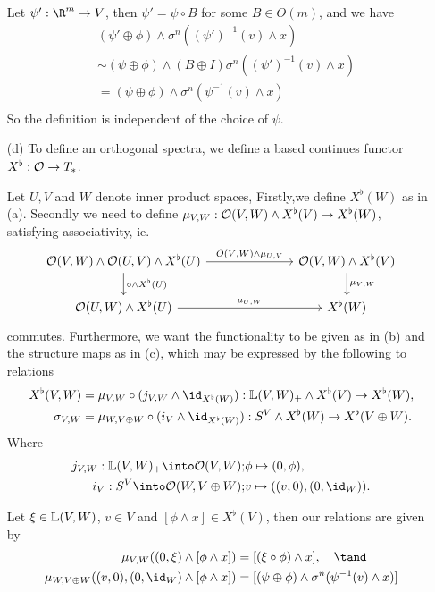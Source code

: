 \begin{exercise}[2]
\begin{enumerate}
Let $\psi' : \R^m \to V$, then $\psi' = \psi \circ B$ for some $B \in O(m)$, and
we have
\begin{align*}
&(\psi' \oplus \phi) \wedge \sigma^n ((\psi')^{-1}(v) \wedge x) \\
&\sim (\psi \oplus \phi) \wedge (B \oplus I)\sigma^n ((\psi')^{-1}(v) \wedge x) \\
&= (\psi \oplus \phi) \wedge \sigma^n (\psi^{-1}(v) \wedge x) \\
\end{align*}
So the definition is independent of the choice of $\psi$.

\item[(d)]
To define an orthogonal spectra, we define a based continues functor $X^\flat :
\mathcal{O} \to T_*$. 


Let $U, V$ and $W$ denote inner product spaces, 
Firstly,we define $X^\flat (W)$ as in (a). Secondly we need to define 
$\mu_{V,W}: \mathcal{O}(V, W) \wedge X^\flat(V) \to X^\flat(W)$, satisfying
associativity, ie. 
\[ \begin{tikzcd}[column sep = 7em]
\O(V, W) \wedge \O(U,V) \wedge X^\flat(U) 
\arrow[r, "O(V{,}W) \wedge \mu_{U{,}V}"] 
\arrow[d, "\circ \wedge X^\flat(U)"] 
& \O(V, W) \wedge X^\flat(V) 
\arrow[d, "\mu_{V{,}W}"] \\ 
\O(U,W) \wedge X^\flat(U) 
\arrow[r, "\mu_{U{,}W}"] 
& X^\flat(W)
\end{tikzcd} \]
commutes. Furthermore, we want the functionality to be given as in (b) and the
structure maps as in (c), which may be expressed by the following to relations
\begin{equation}
\begin{split}
X^\flat(V,W) &= \mu_{V, W} \circ (j_{V,W} \wedge \id_{X^\flat(W)}) : 
\L(V, W)_+ \wedge X^\flat (V) \to X^\flat(W),
\\
\sigma_{V,W} &= \mu_{W,V\oplus W} \circ (i_V \wedge \id_{X^\flat(W)}) :
S^V \wedge X^\flat (W) \to X^\flat(V \oplus W).
\end{split}
\end{equation}
Where 
\begin{align*}
j_{V,W} : \L(V,W)_+ \into \O(V,W); & \phi \mapsto (0,\phi), \\
i_V : S^V \into \O(W, V\oplus W); & v \mapsto ((v,0), (0,\id_W)).
\end{align*}

Let $\xi \in \mathbb{L}(V, W)$, $v \in V$ and $[\phi \wedge x] \in X^\flat(V)$,
then our relations are given by
\begin{align*}
\mu_{V,W}((0,\xi) \wedge [\phi \wedge x]) &= [(\xi \circ \phi) \wedge x], \quad\tand \\
\mu_{W,V\oplus W}((v, 0),(0,\id_W) \wedge [\phi \wedge x]) 
&= [(\psi \oplus \phi) \wedge \sigma^n(\psi^{-1}(v) \wedge x)]
\end{align*}


\end{enumerate}
\end{exercise}
